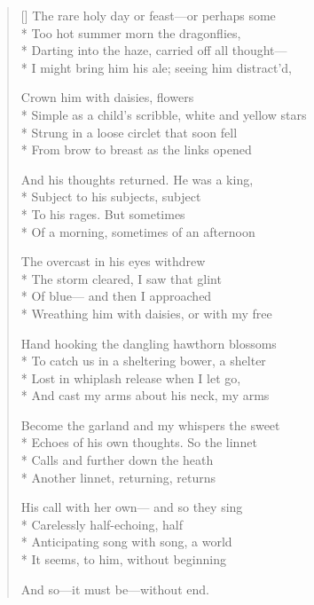 \label{ch:lear_ab}
\settowidth{\versewidth}{Simple as a child's scribble, white and yellow stars}
\begin{verse}[\versewidth]
 The rare holy day or feast---or perhaps some\\*
Too hot summer morn the dragonflies,\\*
Darting into the haze, carried off all thought---\\*
I might bring him his ale; seeing him distract'd,

Crown him with daisies, flowers\\*
Simple as a child's scribble, white and yellow stars\\*
Strung in a loose circlet that soon fell\\*
From brow to breast as the links opened

And his thoughts returned. He was a king,\\*
Subject to his subjects, subject\\*
To his rages. But sometimes\\*
Of a morning, sometimes of an afternoon

The overcast in his eyes withdrew\\*
The storm cleared, I saw that glint\\*
Of blue--- and then I approached\\*
Wreathing him with daisies, or with my free

Hand hooking the dangling hawthorn blossoms\\*
To catch us in a sheltering bower, a shelter\\*
Lost in whiplash release when I let go,\\*
And cast my arms about his neck, my arms

Become the garland and my whispers the sweet\\*
Echoes of his own thoughts.   So the linnet\\*
Calls and further down the heath\\*
Another linnet, returning, returns

His call with her own--- and so they sing\\*
Carelessly half-echoing, half\\*
Anticipating song with song, a world\\*
It seems, to him, without beginning

And so---it must be---without end.
\end{verse}
